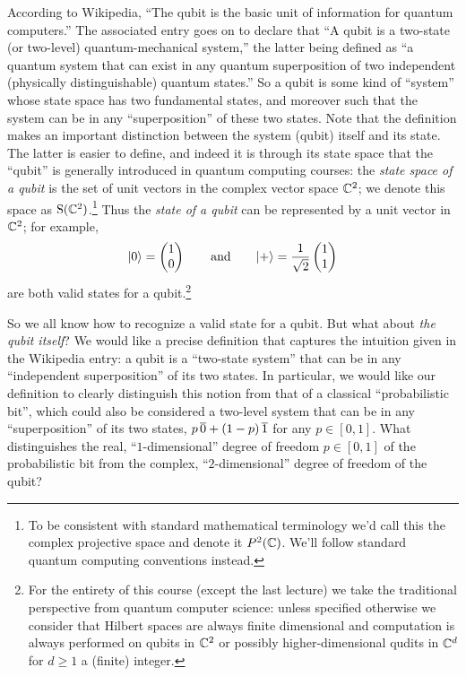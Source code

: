 According to Wikipedia, ``The qubit is the basic unit of information for quantum computers.'' The associated entry goes on to declare that ``A qubit is a two-state (or two-level) quantum-mechanical system,'' the latter being defined as ``a quantum system that can exist in any quantum superposition of two independent (physically distinguishable) quantum states.'' So a qubit is some kind of ``system'' whose state space has two fundamental states, and moreover such that the system can be in any ``superposition'' of these two states. Note that the definition makes an important distinction between the system (qubit) itself and its state. The latter is easier to define, and indeed it is through its state space that the  ``qubit'' is generally introduced in quantum computing courses: the \emph{state space of a qubit} is the set of unit vectors in the complex vector space $\mathbb{C}^2$; we denote this space as $\mathrm{S}(\mathbb{C}^2)$.\footnote{To be consistent with standard mathematical terminology we'd call this the complex projective space and denote it $P^2(\mathbb{C})$. We'll follow standard quantum computing conventions instead.} Thus the \emph{state of a qubit} can be represented by a unit vector in $\mathbb{C}^2$; for example, 
\[|0\rangle = \begin{pmatrix} 1 \\ 0 \end{pmatrix}\qquad\text{and}\qquad |+\rangle = \frac{1}{\sqrt{2}}\begin{pmatrix} 1 \\ 1 \end{pmatrix}\]
are both valid states for a qubit.\footnote{For the entirety of this course (except the last lecture) we take the traditional perspective from quantum computer science: unless specified otherwise we consider that Hilbert spaces are always finite dimensional and computation is always performed on qubits in $\mathbb{C}^2$ or possibly higher-dimensional qudits in $\mathbb{C}^d$ for $d\geq 1$ a (finite) integer.}

So we all know how to recognize a valid state for a qubit. But what about \emph{the qubit itself}? We would like a precise definition that captures the intuition given in the Wikipedia entry: a qubit is a ``two-state system'' that can be in any ``independent superposition'' of its two states. In particular, we would like our definition to clearly distinguish this notion from that of a classical ``probabilistic bit'', which could also be considered a two-level system that can be in any ``superposition'' of its two states, $p \,\overline{0} + (1-p)\,\overline{1}$ for any $p\in [0,1]$. What distinguishes the real, ``$1$-dimensional'' degree of freedom $p\in [0,1]$  of the probabilistic bit from the complex, ``$2$-dimensional'' degree of freedom of the qubit?

